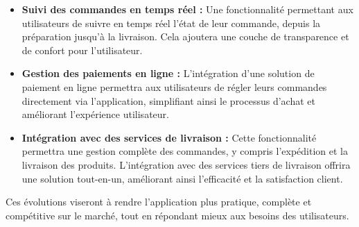 \begin{itemize}
    \item \textbf{Suivi des commandes en temps réel :} Une fonctionnalité permettant aux utilisateurs de suivre en temps réel l'état de leur commande, depuis la préparation jusqu'à la livraison. Cela ajoutera une couche de transparence et de confort pour l'utilisateur.
    
    \item \textbf{Gestion des paiements en ligne :} L'intégration d'une solution de paiement en ligne permettra aux utilisateurs de régler leurs commandes directement via l'application, simplifiant ainsi le processus d'achat et améliorant l'expérience utilisateur.
    
    \item \textbf{Intégration avec des services de livraison :} Cette fonctionnalité permettra une gestion complète des commandes, y compris l'expédition et la livraison des produits. L'intégration avec des services tiers de livraison offrira une solution tout-en-un, améliorant ainsi l'efficacité et la satisfaction client.
\end{itemize}
Ces évolutions viseront à rendre l'application plus pratique, complète et compétitive sur le marché, tout en répondant mieux aux besoins des utilisateurs.
